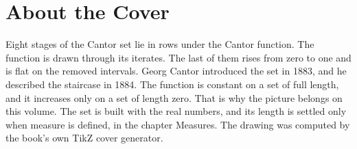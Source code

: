 \backmatter
\cleardoublepage
\chapter*{About the Cover}
\noindent Eight stages of the Cantor set lie in rows under the Cantor function. The function is drawn through its iterates. The last of them rises from zero to one and is flat on the removed intervals. Georg Cantor introduced the set in 1883, and he described the staircase in 1884. The function is constant on a set of full length, and it increases only on a set of length zero. That is why the picture belongs on this volume. The set is built with the real numbers, and its length is settled only when measure is defined, in the chapter Measures. The drawing was computed by the book's own TikZ cover generator.
